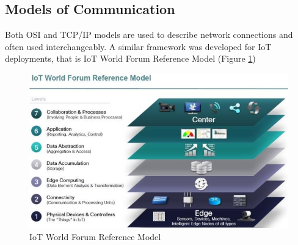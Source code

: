\documentclass[10pt,a4paper]{article}
\begin{document}
\subsection{Models of Communication}

Both OSI and TCP/IP models are used to describe network connections and often used interchangeably. A similar framework was developed for IoT deployments, that is IoT World Forum Reference Model (Figure \ref{IoT-World-Forum-Reference-Model})


\begin{figure}[hbtp]
\caption{IoT World Forum Reference Model}\label{IoT-World-Forum-Reference-Model}
\centering
\includegraphics[scale=1]{IoT-World-Forum-Reference-Model.png}
\end{figure}
\end{document}

